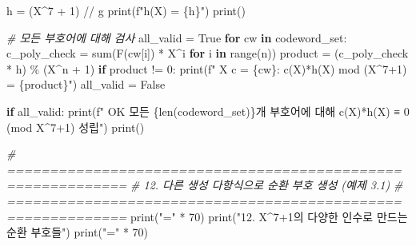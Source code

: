 \documentclass[
  oneside]{article}
\newenvironment{Shaded}{}{}
\newcommand{\BuiltInTok}[1]{\textcolor[rgb]{0.00,0.50,0.00}{#1}}
\newcommand{\CommentTok}[1]{\textcolor[rgb]{0.38,0.63,0.69}{\textit{#1}}}
\newcommand{\ControlFlowTok}[1]{\textcolor[rgb]{0.00,0.44,0.13}{\textbf{#1}}}
\newcommand{\DecValTok}[1]{\textcolor[rgb]{0.25,0.63,0.44}{#1}}
\newcommand{\KeywordTok}[1]{\textcolor[rgb]{0.00,0.44,0.13}{\textbf{#1}}}
\newcommand{\NormalTok}[1]{#1}
\newcommand{\OperatorTok}[1]{\textcolor[rgb]{0.40,0.40,0.40}{#1}}
\newcommand{\SpecialCharTok}[1]{\textcolor[rgb]{0.25,0.44,0.63}{#1}}
\newcommand{\SpecialStringTok}[1]{\textcolor[rgb]{0.73,0.40,0.53}{#1}}
\newcommand{\StringTok}[1]{\textcolor[rgb]{0.25,0.44,0.63}{#1}}
\newcommand{\VariableTok}[1]{\textcolor[rgb]{0.10,0.09,0.49}{#1}}
\begin{document}
\begin{Shaded}
\begin{Highlighting}[]
\NormalTok{h }\OperatorTok{=}\NormalTok{ (X}\OperatorTok{\^{}}\DecValTok{7} \OperatorTok{+} \DecValTok{1}\NormalTok{) }\OperatorTok{//}\NormalTok{ g}
\BuiltInTok{print}\NormalTok{(}\SpecialStringTok{f"h(X) = }\SpecialCharTok{\{}\NormalTok{h}\SpecialCharTok{\}}\SpecialStringTok{"}\NormalTok{)}
\BuiltInTok{print}\NormalTok{()}

\CommentTok{\# 모든 부호어에 대해 검사}
\NormalTok{all\_valid }\OperatorTok{=} \VariableTok{True}
\ControlFlowTok{for}\NormalTok{ cw }\KeywordTok{in}\NormalTok{ codeword\_set:}
\NormalTok{    c\_poly\_check }\OperatorTok{=} \BuiltInTok{sum}\NormalTok{(F(cw[i]) }\OperatorTok{*}\NormalTok{ X}\OperatorTok{\^{}}\NormalTok{i }\ControlFlowTok{for}\NormalTok{ i }\KeywordTok{in} \BuiltInTok{range}\NormalTok{(n))}
\NormalTok{    product }\OperatorTok{=}\NormalTok{ (c\_poly\_check }\OperatorTok{*}\NormalTok{ h) }\OperatorTok{\%}\NormalTok{ (X}\OperatorTok{\^{}}\NormalTok{n }\OperatorTok{+} \DecValTok{1}\NormalTok{)}
    \ControlFlowTok{if}\NormalTok{ product }\OperatorTok{!=} \DecValTok{0}\NormalTok{:}
        \BuiltInTok{print}\NormalTok{(}\SpecialStringTok{f"  X c = }\SpecialCharTok{\{}\NormalTok{cw}\SpecialCharTok{\}}\SpecialStringTok{: c(X)*h(X) mod (X\^{}7+1) = }\SpecialCharTok{\{}\NormalTok{product}\SpecialCharTok{\}}\SpecialStringTok{"}\NormalTok{)}
\NormalTok{        all\_valid }\OperatorTok{=} \VariableTok{False}

\ControlFlowTok{if}\NormalTok{ all\_valid:}
    \BuiltInTok{print}\NormalTok{(}\SpecialStringTok{f"  OK 모든 }\SpecialCharTok{\{}\BuiltInTok{len}\NormalTok{(codeword\_set)}\SpecialCharTok{\}}\SpecialStringTok{개 부호어에 대해 c(X)*h(X) ≡ 0 (mod X\^{}7+1) 성립"}\NormalTok{)}
\BuiltInTok{print}\NormalTok{()}

\CommentTok{\# ============================================================}
\CommentTok{\# 12. 다른 생성 다항식으로 순환 부호 생성 (예제 3.1)}
\CommentTok{\# ============================================================}
\BuiltInTok{print}\NormalTok{(}\StringTok{"="} \OperatorTok{*} \DecValTok{70}\NormalTok{)}
\BuiltInTok{print}\NormalTok{(}\StringTok{"12. X\^{}7+1의 다양한 인수로 만드는 순환 부호들"}\NormalTok{)}
\BuiltInTok{print}\NormalTok{(}\StringTok{"="} \OperatorTok{*} \DecValTok{70}\NormalTok{)}


\end{Highlighting}
\end{Shaded}
\end{document}
